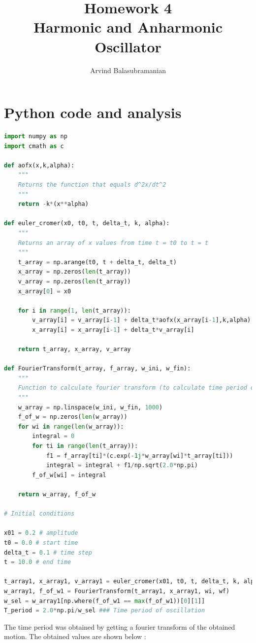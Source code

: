 \documentclass[a4paper,10pt]{article}
\title{Homework 4 \\
\textbf{Harmonic and Anharmonic Oscillator}}
\author{Arvind Balasubramanian}
\date{}
\begin{document}
\maketitle
\section*{Python code and analysis}
\begin{lstlisting}[language=python]
import numpy as np
import cmath as c

def aofx(x,k,alpha):
    """
    Returns the function that equals d^2x/dt^2
    """
    return -k*(x**alpha)

def euler_cromer(x0, t0, t, delta_t, k, alpha):
    """
    Returns an array of x values from time t = t0 to t = t
    """
    t_array = np.arange(t0, t + delta_t, delta_t)
    x_array = np.zeros(len(t_array))
    v_array = np.zeros(len(t_array))
    x_array[0] = x0

    for i in range(1, len(t_array)):
        v_array[i] = v_array[i-1] + delta_t*aofx(x_array[i-1],k,alpha)
        x_array[i] = x_array[i-1] + delta_t*v_array[i]

    return t_array, x_array, v_array

def FourierTransform(t_array, f_array, w_ini, w_fin):
    """
    Function to calculate fourier transform (to calculate time period of oscillation)
    """
    w_array = np.linspace(w_ini, w_fin, 1000)
    f_of_w = np.zeros(len(w_array))
    for wi in range(len(w_array)):
        integral = 0
        for ti in range(len(t_array)):
            f1 = f_array[ti]*(c.exp(-1j*w_array[wi]*t_array[ti]))
            integral = integral + f1/np.sqrt(2.0*np.pi)
        f_of_w[wi] = integral

    return w_array, f_of_w
    
# Initial conditions        

x01 = 0.2 # amplitude
t0 = 0.0 # start time
delta_t = 0.1 # time step
t = 10.0 # end time

t_array1, x_array1, v_array1 = euler_cromer(x01, t0, t, delta_t, k, alpha)
w_array1, f_of_w1 = FourierTransform(t_array1, x_array1, wi, wf)
w_sel = w_array1[np.where(f_of_w1 == max(f_of_w1))[0][1]]
T_period = 2.0*np.pi/w_sel ### Time period of oscillation

\end{lstlisting}

The time period was obtained by getting a fourier transform of the obtained motion. The obtained values are shown below :
\end{document}
